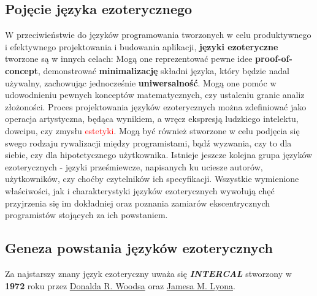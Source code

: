 \documentclass[fleqn,10pt]{SelfArx} %
\begin{document}
\subsection{Pojęcie języka ezoterycznego}
	W przeciwieństwie do języków programowania tworzonych w celu produktywnego i efektywnego
	projektowania i budowania aplikacji, \textbf{języki ezoteryczne} tworzone są w innych celach: Mogą one reprezentować pewne idee \textbf{proof-of-concept},
	demonstrować \textbf{minimalizację} składni języka, który będzie nadal używalny, zachowując jednocześnie \textbf{uniwersalność}.
	Mogą one pomóc w udowodnieniu pewnych konceptów matematycznych, czy ustaleniu granic analiz złożoności.
	Proces projektowania języków ezoterycznych można zdefiniować jako operacja artystyczna,
	będąca wynikiem, a wręcz ekspresją ludzkiego intelektu, dowcipu, czy zmysłu \textcolor{red}{estetyki}.
	Mogą być również stworzone w celu podjęcia się swego rodzaju rywalizacji między programistami, bądź wyzwania, czy to dla siebie, czy dla hipotetycznego użytkownika.
	Istnieje jeszcze kolejna grupa języków ezoterycznych - języki prześmiewcze, napisanych ku uciesze autorów, użytkowników, czy choćby czytelników ich specyfikacji.\cite{morr2015esoteric}
	Wszystkie wymienione właściwości, jak i charakterystyki języków ezoterycznych wywołują chęć przyjrzenia się im dokładniej oraz poznania zamiarów ekscentrycznych programistów stojących za ich powstaniem.


\subsection{Geneza powstania języków ezoterycznych}
Za najstarszy znany język ezoteryczny uważa się \hypertarget{oldestLang}{\textbf{\textit{INTERCAL}}} stworzony w \textbf{1972} roku 
przez \underline{Donalda R. Woodsa} oraz \underline{Jamesa M. Lyona}.
\end{document}
